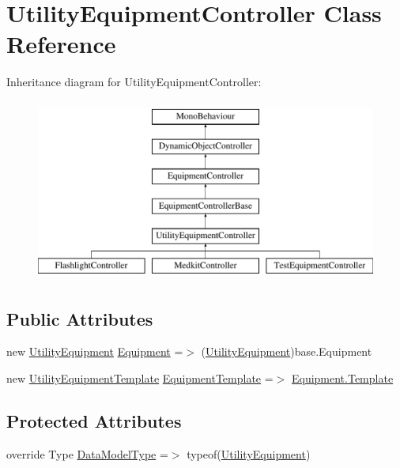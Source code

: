 \hypertarget{class_utility_equipment_controller}{}\section{Utility\+Equipment\+Controller Class Reference}
\label{class_utility_equipment_controller}
Inheritance diagram for Utility\+Equipment\+Controller\+:\begin{figure}[H]
\begin{center}
\leavevmode
\includegraphics[height=6.000000cm]{class_utility_equipment_controller}
\end{center}
\end{figure}
\subsection*{Public Attributes}
\begin{DoxyCompactItemize}
\item 
new \mbox{\hyperlink{class_utility_equipment}{Utility\+Equipment}} \mbox{\hyperlink{class_utility_equipment_controller_a44a8fae78163d7e45aac8c3b5c21a071}{Equipment}} =$>$ (\mbox{\hyperlink{class_utility_equipment}{Utility\+Equipment}})base.\+Equipment
\item 
new \mbox{\hyperlink{class_utility_equipment_template}{Utility\+Equipment\+Template}} \mbox{\hyperlink{class_utility_equipment_controller_a6e31152dd67ca7a5dea510d97676f7b6}{Equipment\+Template}} =$>$ \mbox{\hyperlink{class_equipment_a691c8de53afa564d0b1a0f1adb0978b7}{Equipment.\+Template}}
\end{DoxyCompactItemize}
\subsection*{Protected Attributes}
\begin{DoxyCompactItemize}
\item 
override Type \mbox{\hyperlink{class_utility_equipment_controller_a7c5f9d10210bc202ae516a5bf0ff3c39}{Data\+Model\+Type}} =$>$ typeof(\mbox{\hyperlink{class_utility_equipment}{Utility\+Equipment}})
\end{DoxyCompactItemize}
